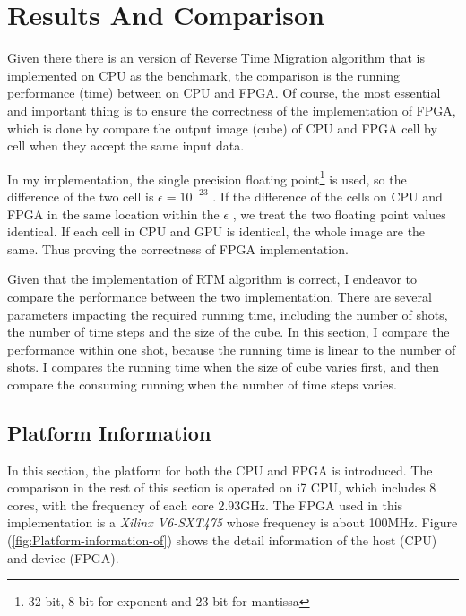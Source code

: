 \chapter{Results And Comparison} %

Given there there is an version of Reverse Time Migration algorithm
that is implemented on CPU as the benchmark, the comparison is the
running performance (time) between on CPU and FPGA. Of course, the
most essential and important thing is to ensure the correctness of
the implementation of FPGA, which is done by compare the output image
(cube) of CPU and FPGA cell by cell when they accept the same input
data.

In my implementation, the single precision floating point\footnote{32
bit, 8 bit for exponent and 23 bit for mantissa} is used, so the difference
of the two cell is \( \epsilon=10^{-23} \)
. If the difference of the cells on CPU and FPGA in the same location
within the \( \epsilon \)
, we treat the two floating point values identical. If each cell in
CPU and GPU is identical, the whole image are the same. Thus proving
the correctness of FPGA implementation.

Given that the implementation of RTM algorithm is correct, I endeavor
to compare the performance between the two implementation. There are
several parameters impacting the required running time, including
the number of shots, the number of time steps and the size of the
cube. In this section, I compare the performance within one shot,
because the running time is linear to the number of shots. I compares
the running time when the size of cube varies first, and then compare
the consuming running when the number of time steps varies.

\section{Platform Information} %

In this section, the platform for both the CPU and FPGA is introduced.
The comparison in the rest of this section is operated on i7 CPU,
which includes 8 cores, with the frequency of each core 2.93GHz. The
FPGA used in this implementation is a \emph{Xilinx V6-SXT475} whose
frequency is about 100MHz. Figure (\ref{fig:Platform-information-of})
shows the detail information of the host (CPU) and device (FPGA).

